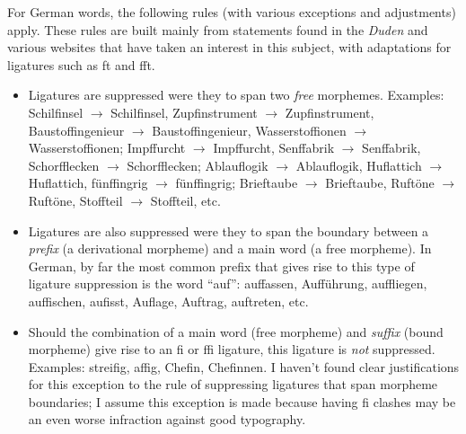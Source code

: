 \documentclass[11pt]{article}
\begin{document}
For German words, the following rules (with various exceptions and adjustments) apply. These rules are built mainly from statements found in the \emph{Duden} and various websites that have taken an interest in this subject, with adaptations for ligatures such as ft and fft.
\begin{itemize}
\item Ligatures are suppressed were they to span two \emph{free} morphemes. Examples: Schil\mbox{fi}nsel $\to$ Schilfinsel, Zup\mbox{fi}nstrument $\to$ Zupfinstrument, Bausto\mbox{ffi}ngenieur $\to$ Baustoffingenieur, Wassersto\mbox{ffi}onen $\to$ Wasserstoffionen; Imp\mbox{ff}urcht $\to$ Impffurcht, Sen\mbox{ff}abrik $\to$ Senffabrik, Schor\mbox{ffl}ecken $\to$ Schorfflecken; Ablau\mbox{fl}ogik $\to$ Ablauflogik, Hu\mbox{fl}attich $\to$ Huflattich, fün\mbox{ffi}ngrig $\to$ fünf\mbox{fi}ngrig; Brie\mbox{ft}aube $\to$ Brieftaube, Ru\mbox{ft}öne $\to$ Ruftöne, Sto\mbox{fft}eil $\to$ Stoffteil, etc.


\item Ligatures are also suppressed were they to span the boundary between a \emph{prefix} (a derivational morpheme) and a main word (a free morpheme). In German, by far the most common prefix that gives rise to this type of ligature suppression is the word \enquote{auf}: auffassen, Aufführung, auffliegen, auffischen, auf\breaklig iss\breaklig t, Auflage, Auftrag, auftreten, etc.

\item Should the combination of a main word (free morpheme) and \emph{suffix} (bound morpheme) give rise to an fi or ffi ligature, this ligature is \emph{not} suppressed. Examples: streifig, affig, Chefin, Chefinnen. I haven't found clear justifications for this exception to the rule of suppressing ligatures that span morpheme boundaries; I assume this exception is made because having f\breaklig i clashes may be an even worse infraction against good typography.



\end{itemize}
\end{document}
